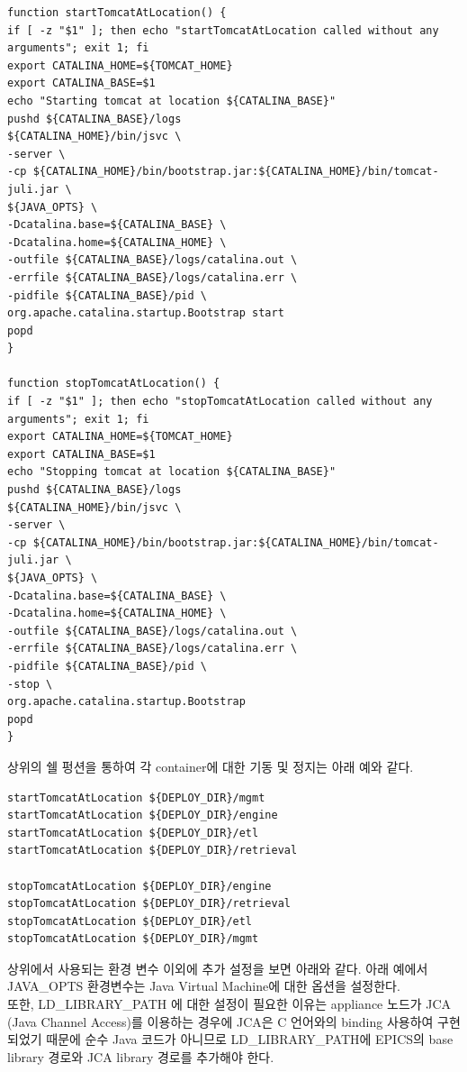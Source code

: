 \documentclass[11pt
  , a4paper
  , article
  , oneside
]{memoir}
\begin{document}
\begin{lstlisting}[style=termstyle]
function startTomcatAtLocation() { 
if [ -z "$1" ]; then echo "startTomcatAtLocation called without any arguments"; exit 1; fi
export CATALINA_HOME=${TOMCAT_HOME}
export CATALINA_BASE=$1
echo "Starting tomcat at location ${CATALINA_BASE}"
pushd ${CATALINA_BASE}/logs
${CATALINA_HOME}/bin/jsvc \
-server \
-cp ${CATALINA_HOME}/bin/bootstrap.jar:${CATALINA_HOME}/bin/tomcat-juli.jar \
${JAVA_OPTS} \
-Dcatalina.base=${CATALINA_BASE} \
-Dcatalina.home=${CATALINA_HOME} \
-outfile ${CATALINA_BASE}/logs/catalina.out \
-errfile ${CATALINA_BASE}/logs/catalina.err \
-pidfile ${CATALINA_BASE}/pid \
org.apache.catalina.startup.Bootstrap start
popd
}

function stopTomcatAtLocation() { 
if [ -z "$1" ]; then echo "stopTomcatAtLocation called without any arguments"; exit 1; fi
export CATALINA_HOME=${TOMCAT_HOME}
export CATALINA_BASE=$1
echo "Stopping tomcat at location ${CATALINA_BASE}"
pushd ${CATALINA_BASE}/logs
${CATALINA_HOME}/bin/jsvc \
-server \
-cp ${CATALINA_HOME}/bin/bootstrap.jar:${CATALINA_HOME}/bin/tomcat-juli.jar \
${JAVA_OPTS} \
-Dcatalina.base=${CATALINA_BASE} \
-Dcatalina.home=${CATALINA_HOME} \
-outfile ${CATALINA_BASE}/logs/catalina.out \
-errfile ${CATALINA_BASE}/logs/catalina.err \
-pidfile ${CATALINA_BASE}/pid \
-stop \
org.apache.catalina.startup.Bootstrap 
popd
}

\end{lstlisting}

상위의 쉘 펑션을 통하여 각 container에 대한 기동 및 정지는 아래 예와 같다.

\begin{lstlisting}[style=termstyle]
startTomcatAtLocation ${DEPLOY_DIR}/mgmt
startTomcatAtLocation ${DEPLOY_DIR}/engine
startTomcatAtLocation ${DEPLOY_DIR}/etl
startTomcatAtLocation ${DEPLOY_DIR}/retrieval

stopTomcatAtLocation ${DEPLOY_DIR}/engine
stopTomcatAtLocation ${DEPLOY_DIR}/retrieval
stopTomcatAtLocation ${DEPLOY_DIR}/etl
stopTomcatAtLocation ${DEPLOY_DIR}/mgmt
\end{lstlisting}

상위에서 사용되는 환경 변수 이외에 추가 설정을 보면 아래와 같다.
아래 예에서 JAVA\_OPTS 환경변수는 Java Virtual Machine에 대한 옵션을 설정한다. \\ 또한, LD\_LIBRARY\_PATH 에 대한 설정이 필요한 이유는 appliance 노드가 JCA (Java Channel Access)를 이용하는 경우에 JCA은 C 언어와의 binding 사용하여 구현 되었기 때문에 순수 Java 코드가 아니므로 LD\_LIBRARY\_PATH에 EPICS의 base library 경로와 JCA library 경로를 추가해야 한다. 
\end{document}
